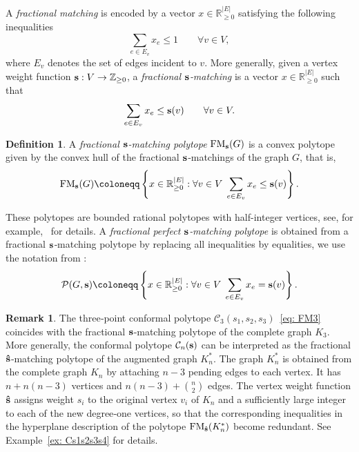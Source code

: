 \documentclass[12pt,a4paper]{extarticle}
\theoremstyle{definition}
\newtheorem{definition}[theorem]{Definition}
\newtheorem{remark}[theorem]{Remark}
\begin{document}
A \emph{fractional matching} is encoded by a vector
$x\in\mathbb{R}_{\ge0}^{|E|}$ satisfying the following inequalities 
$$
\sum_{e\in E_v} x_e \le 1 \qquad \forall v\in V,
$$
where $E_v$ denotes the set of edges incident to $v$.
More generally, given a vertex weight function ${\bf s}:V\to\mathbb{Z}_{\ge0}$, a
\emph{fractional ${\bf s}$‑matching} is a vector $x\in\mathbb{R}_{\ge0}^{|E|}$ such that
$$
\sum_{e\in E_v} x_e \le {\bf s}(v) \qquad \forall v\in V.
$$
\begin{definition}
A \emph{fractional ${\bf s}$-matching polytope} ${\rm FM}_{\bf s}(G)$ is a convex polytope given by the convex hull of the  fractional ${\bf s}$‑matchings of the graph $G$, that is, 
\begin{equation}\label{eq: fractional s-matching}
{\rm FM}_{\bf s}(G) \coloneqq
\left\{
x \in \mathbb{R}_{\ge 0}^{|E|} :
\forall v \in V \; \sum_{e \in E_v} x_e \le {\bf s}(v)
\right\}.    
\end{equation}       
\end{definition}
These polytopes are bounded rational polytopes with half-integer vertices, see, for example,~\cite{Balinski1965} for details.
A \emph{fractional perfect ${\bf s}$‑matching polytope} is obtained from a fractional ${\bf s}$‑matching polytope by replacing all  inequalities by equalities, we use the notation from \cite{BEHREND20133822}:
\begin{equation}\label{eq: fractional perfect s-matching}
 \mathcal{P}(G,{\bf s}) \coloneqq \left\{
x \in \mathbb{R}_{\ge 0}^{|E|} :
\forall v \in V \; \sum_{e \in E_v} x_e = {\bf s}(v)
\right\}.   
\end{equation}
\begin{remark}
The three‑point conformal polytope $\mathcal{C}_3(s_1,s_2,s_3)$~\eqref{eq: FM3} coincides with the fractional ${\bf s}$‑matching
polytope of the complete graph $K_3$.
More generally, the conformal polytope $\mathcal{C}_n({\bf s})$ can be interpreted as the fractional
${\bf \hat{s}}$‑matching polytope of the augmented graph $K_n^*$.
The graph $K_n^*$ is obtained from the complete graph $K_n$ by attaching $n-3$ pending edges to
each vertex. It has $n+n(n-3)$ vertices and $n(n-3)+\binom{n}{2}$ edges.
The vertex weight function ${\bf \hat{s}}$ assigns weight $s_i$ to the original vertex $v_i$ of
$K_n$ and a sufficiently large integer to each of the new degree‑one vertices, so that the
corresponding inequalities in the hyperplane description of the polytope
${\rm FM}_{\bf \hat{s}}(K_n^*)$ become redundant. See Example~\ref{ex: Cs1s2s3s4} for details.
\end{remark}
\end{document}

